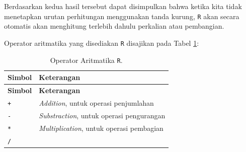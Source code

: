 \documentclass[12pt,]{krantz}
\begin{document}
Berdasarkan kedua hasil tersebut dapat disimpulkan bahwa ketika kita tidak menetapkan urutan perhitungan menggunakan tanda kurung, \texttt{R} akan secara otomatis akan menghitung terlebih dahulu perkalian atau pembangian.

Operator aritmatika yang disediakan \texttt{R} disajikan pada Tabel \ref{tab:oparitmatika}:

\begin{longtable}[]{@{}ll@{}}
\caption{\label{tab:oparitmatika} Operator Aritmatika \texttt{R}.}\tabularnewline
\toprule
\begin{minipage}[b]{0.14\columnwidth}\raggedright
\textbf{Simbol}\strut
\end{minipage} & \begin{minipage}[b]{0.80\columnwidth}\raggedright
\textbf{Keterangan}\strut
\end{minipage}\tabularnewline
\midrule
\endfirsthead
\toprule
\begin{minipage}[b]{0.14\columnwidth}\raggedright
\textbf{Simbol}\strut
\end{minipage} & \begin{minipage}[b]{0.80\columnwidth}\raggedright
\textbf{Keterangan}\strut
\end{minipage}\tabularnewline
\midrule
\endhead
\begin{minipage}[t]{0.14\columnwidth}\raggedright
\texttt{+}\strut
\end{minipage} & \begin{minipage}[t]{0.80\columnwidth}\raggedright
\emph{Addition}, untuk operasi penjumlahan\strut
\end{minipage}\tabularnewline
\begin{minipage}[t]{0.14\columnwidth}\raggedright
\texttt{-}\strut
\end{minipage} & \begin{minipage}[t]{0.80\columnwidth}\raggedright
\emph{Substraction}, untuk operasi pengurangan\strut
\end{minipage}\tabularnewline
\begin{minipage}[t]{0.14\columnwidth}\raggedright
\texttt{*}\strut
\end{minipage} & \begin{minipage}[t]{0.80\columnwidth}\raggedright
\emph{Multiplication}, untuk operasi pembagian\strut
\end{minipage}\tabularnewline
\begin{minipage}[t]{0.14\columnwidth}\raggedright
\texttt{/}\strut
\end{minipage} & \begin{minipage}[t]{0.80\columnwidth}\raggedright

\end{minipage}
\end{longtable}
\end{document}
